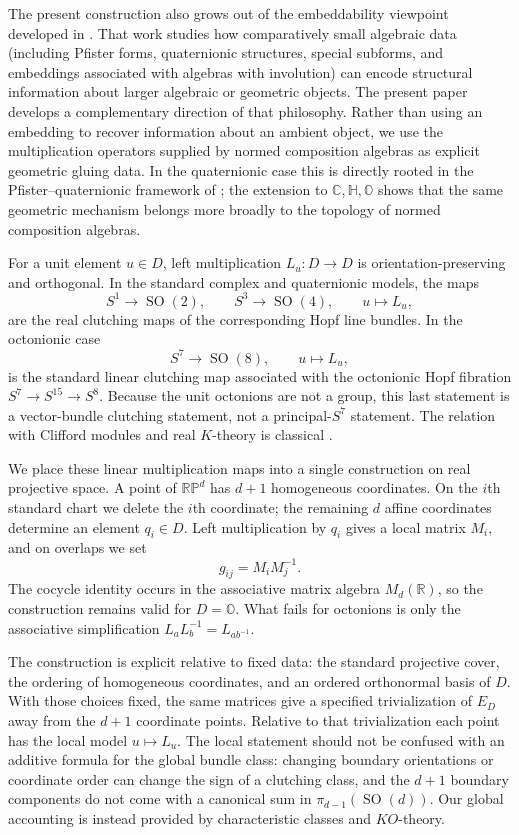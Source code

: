 \documentclass[12pt]{article}
\theoremstyle{plain}
\theoremstyle{definition}
\newcommand{\R}{\mathbb R}
\newcommand{\C}{\mathbb C}
\newcommand{\Hh}{\mathbb H}
\newcommand{\Oct}{\mathbb O}
\newcommand{\RP}{\mathbb{RP}}
\newcommand{\SO}{\operatorname{SO}}
\begin{document}
The present construction also grows out of the embeddability viewpoint developed
in \cite{OmanovicThesis}. That work studies how comparatively
small algebraic data (including Pfister forms, quaternionic structures, special subforms, and embeddings associated with algebras with involution) can encode structural information about larger algebraic or geometric objects. The present paper develops a complementary direction of that philosophy. Rather than using an embedding to recover information about an ambient object, we use the multiplication operators supplied by normed composition algebras as explicit
geometric gluing data. In the quaternionic case this is directly rooted in the
Pfister--quaternionic framework of \cite{OmanovicThesis}; the extension to
$\C,\Hh,\Oct$ shows that the same geometric mechanism belongs more broadly to
the topology of normed composition algebras.

For a unit element $u\in D$, left multiplication
$L_u:D\to D$ is orientation-preserving and orthogonal. In the standard
complex and quaternionic models, the maps
\[
S^1\to\SO(2),\qquad S^3\to\SO(4),\qquad u\mapsto L_u,
\]
are the real clutching maps of the corresponding Hopf line bundles. In
the octonionic case
\[
S^7\to\SO(8),\qquad u\mapsto L_u,
\]
is the standard linear clutching map associated with the octonionic
Hopf fibration $S^7\to S^{15}\to S^8$. Because the unit octonions are
not a group, this last statement is a vector-bundle clutching statement,
not a principal-$S^7$ statement. The relation with Clifford modules and
real $K$-theory is classical \cite{ABS,Baez}.

We place these linear multiplication maps into a single construction on
real projective space. A point of $\RP^d$ has $d+1$ homogeneous
coordinates. On the $i$th standard chart we delete the $i$th
coordinate; the remaining $d$ affine coordinates determine an element
$q_i\in D$. Left multiplication by $q_i$ gives a local matrix $M_i$,
and on overlaps we set
\[
g_{ij}=M_iM_j^{-1}.
\]
The cocycle identity occurs in the associative matrix algebra
$M_d(\R)$, so the construction remains valid for $D=\Oct$. What fails
for octonions is only the associative simplification
$L_aL_b^{-1}=L_{ab^{-1}}$.

The construction is explicit relative to fixed data: the standard
projective cover, the ordering of homogeneous coordinates, and an
ordered orthonormal basis of $D$. With those choices fixed, the same
matrices give a specified trivialization of $E_D$ away from the $d+1$
coordinate points. Relative to that trivialization each point has the
local model $u\mapsto L_u$. The local statement should not be confused
with an additive formula for the global bundle class: changing boundary
orientations or coordinate order can change the sign of a clutching
class, and the $d+1$ boundary components do not come with a canonical
sum in $\pi_{d-1}(\SO(d))$. Our global accounting is instead provided
by characteristic classes and $KO$-theory.
\end{document}
